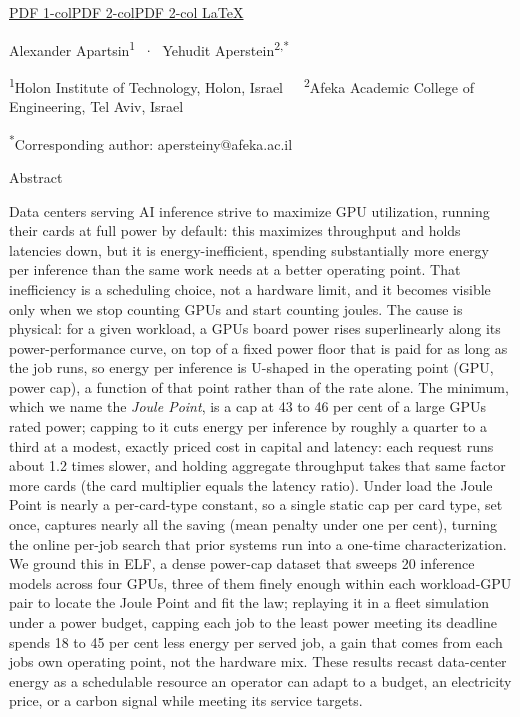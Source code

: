 \href{JoulePoint_1col.pdf}{PDF 1-col}\href{JoulePoint_2col.pdf}{PDF 2-col}\href{JoulePoint_2col_latex.pdf}{PDF 2-col LaTeX}

Alexander Apartsin\textsuperscript{1} ~$\cdot$~ Yehudit Aperstein\textsuperscript{2,*}

\textsuperscript{1}Holon Institute of Technology, Holon, Israel~~~\textsuperscript{2}Afeka Academic College of Engineering, Tel Aviv, Israel

\textsuperscript{*}Corresponding author: apersteiny@afeka.ac.il

Abstract

Data centers serving AI inference strive to maximize GPU utilization, running their cards at full power by
default: this maximizes throughput and holds latencies down, but it is energy-inefficient, spending substantially
more energy per inference than the same work needs at a better operating point. That inefficiency is a scheduling choice, not a hardware
limit, and it becomes visible only when we stop counting GPUs and start counting joules. The cause is physical:
for a given workload, a GPU\textquotesingle s board power rises superlinearly along its power-performance curve, on top of a fixed power floor that is paid
for as long as the job runs, so energy per inference is U-shaped in the operating point (GPU, power cap), a
function of that point rather than of the rate alone. The minimum, which we name the \emph{Joule Point}, is a
cap at 43 to 46 per cent of a large GPU\textquotesingle s rated power; capping to it cuts energy per
inference by roughly a quarter to a third at a modest, exactly priced cost in capital and latency: each request
runs about 1.2 times slower, and holding aggregate throughput takes that same factor more cards (the card
multiplier equals the latency ratio). Under load the Joule Point is nearly a per-card-type constant, so a single
static cap per card type, set once, captures nearly all the saving (mean penalty under one per cent), turning the
online per-job search that prior systems run into a one-time characterization. We ground this in ELF, a dense
power-cap dataset that sweeps 20 inference models across four GPUs, three of them finely enough within each workload-GPU pair to
locate the Joule Point and fit the law; replaying it in a fleet simulation under a power budget, capping each job
to the least power meeting its deadline spends 18 to 45 per cent less energy per served
job, a gain that comes from each job\textquotesingle s own operating point, not the hardware mix. These results recast
data-center energy as a schedulable resource an operator can adapt to a budget, an electricity price, or a
carbon signal while meeting its service targets.

